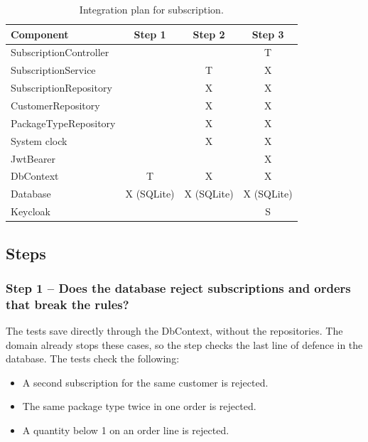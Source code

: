 \documentclass[a4paper,11pt]{article}
\begin{document}
\begin{table}[H]
\centering
\small
{}
\begin{tabular}{@{}l c c c@{}}
\textbf{Component} & \textbf{Step 1} & \textbf{Step 2} & \textbf{Step 3} \\
\hline
SubscriptionController &   &   & T \\
SubscriptionService    &   & T & X \\
SubscriptionRepository &   & X & X \\
CustomerRepository     &   & X & X \\
PackageTypeRepository  &   & X & X \\
System clock           &   & X & X \\
JwtBearer              &   &   & X \\
DbContext              & T & X & X \\
Database               & X (SQLite) & X (SQLite) & X (SQLite) \\
Keycloak               &   &   & S \\
\end{tabular}
\caption{Integration plan for subscription.}
\label{tab:subscription-integration-plan}
\end{table}

\subsection{Steps}
\subsubsection*{Step 1 -- Does the database reject subscriptions and orders that break the rules?}
The tests save directly through the DbContext, without the repositories. The domain already stops these cases, so the step checks the last line of defence in the database. The tests check the following:
\begin{itemize}
  \item A second subscription for the same customer is rejected.
  \item The same package type twice in one order is rejected.
  \item A quantity below 1 on an order line is rejected.
\end{itemize}
\end{document}
